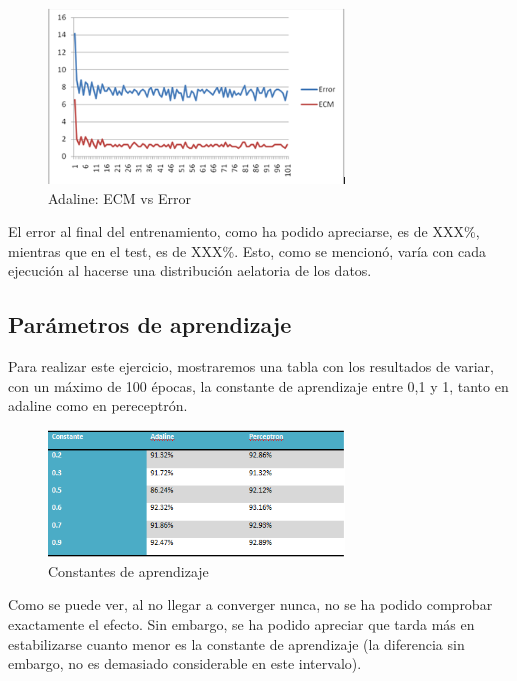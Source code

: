 \documentclass[12pt]{article}
\begin{document}
\begin{figure}[h!]
    \label{fig:fig1}
  \centering
       \includegraphics[width=0.7\textwidth]{recursos/fig8}
    \caption{Adaline: ECM vs Error}
\end{figure} 

El error al final del entrenamiento, como ha podido apreciarse, es de XXX\%, mientras que en el test, es de XXX\%. Esto, como se mencionó, varía con cada ejecución al hacerse una distribución aelatoria de los datos.

\subsection{Parámetros de aprendizaje}

Para realizar este ejercicio, mostraremos una tabla con los resultados de variar, con un máximo de 100 épocas, la constante de aprendizaje entre 0,1 y 1, tanto en adaline como en pereceptrón.

\begin{figure}[h!]
    \label{fig:fig1}
  \centering
       \includegraphics[width=0.7\textwidth]{recursos/fig9}
    \caption{Constantes de aprendizaje}
\end{figure} 

Como se puede ver, al no llegar a converger nunca, no se ha podido comprobar exactamente el efecto. Sin embargo, se ha podido apreciar que tarda más en estabilizarse cuanto menor es la constante de aprendizaje (la diferencia sin embargo, no es demasiado considerable en este intervalo).
\end{document}
